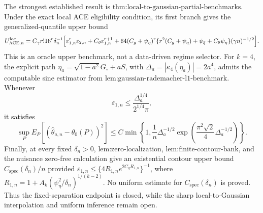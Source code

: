 The strongest established result is \(\text{thm:local-to-gaussian-partial-benchmarks}\). Under the exact local ACE eligibility condition, its first branch gives the generalized-quantile upper bound
\[
 U_{\mathrm{ACE},n}^{\mathrm{loc}}
 =C_{\gamma}r!16^r\delta_n^{-1}\Bigl[
 \varepsilon_{1,n}^r\varepsilon_{2,n}+C_{\theta}\varepsilon_{1,n}^{r+1}
 +64(C_g+\psi_{\eta})^r\{r^2(C_g+\psi_{\eta})+\psi_{\xi}+C_{\theta}\psi_{\eta}\}(\gamma n)^{-1/2}\Bigr].
\]
This is an oracle upper benchmark, not a data-driven regime selector. For \(k=4\), the explicit path \(\eta_a=\sqrt{1-a^2}G_{\circ}+aS\), with \(\Delta_a=|\kappa_4(\eta_a)|=2a^4\), admits the computable sine estimator from \(\text{lem:gaussian-rademacher-l1-benchmark}\). Whenever
\[
 \varepsilon_{1,n}\le\frac{\Delta_a^{1/4}}{2^{1/4}\pi},
\]
it satisfies
\[
 \sup_P E_P[(\widehat\theta_{a,n}-\theta_0(P))^2]
 \le C\min\left\{1,\frac1n\Delta_a^{-1/2}
 \exp\left(\frac{\pi^2\sqrt2}{4}\Delta_a^{-1/2}\right)\right\}.
\]
Finally, at every fixed \(\delta_n>0\), \(\text{lem:zero-localization}\), \(\text{lem:finite-contour-bank}\), and the nuisance zero-free calculation give an existential contour upper bound \(C_{\mathrm{spec}}(\delta_n)/n\) provided \(\varepsilon_{1,n}\le\{4R_{1,n}e^{2C_gR_{1,n}}\}^{-1}\), where \(R_{1,n}=1+A_k(\psi_{\eta}^2/\delta_n)^{1/(k-2)}\). No uniform estimate for \(C_{\mathrm{spec}}(\delta_n)\) is proved. Thus the fixed-separation endpoint is closed, while the sharp local-to-Gaussian interpolation and uniform inference remain open.